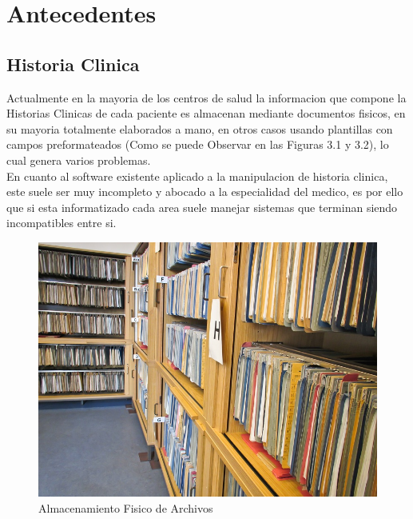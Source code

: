 \chapter{Antecedentes}

\section{Historia Clinica}

Actualmente en la mayoria de los centros de salud la informacion que compone
la Historias Clinicas de cada paciente es almacenan mediante documentos fisicos,
en su mayoria totalmente elaborados a mano, en otros casos usando plantillas
con campos preformateados (Como se puede Observar en las Figuras 3.1 y 3.2),
lo cual genera varios problemas.\\[0.1cm]

En cuanto al software existente aplicado a la manipulacion de historia clinica,
este suele ser muy incompleto y abocado a la especialidad del medico, es por
ello que si esta informatizado cada area suele manejar sistemas que terminan
siendo incompatibles entre si.\\[0.1cm]

\begin{figure}[h]
    \centering
    \includegraphics[scale=1.5]{resourse/folders-archivos.jpg}
    \caption{Almacenamiento Fisico de Archivos}
    \label{fig:05}
\end{figure}  


